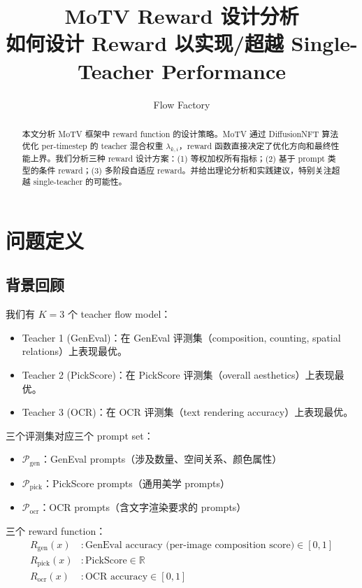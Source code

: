 \documentclass[11pt,a4paper]{article}
\title{\textbf{MoTV Reward 设计分析}\\[0.3em]
\large 如何设计 Reward 以实现/超越 Single-Teacher Performance}
\author{Flow Factory}
\date{}
\newcommand{\R}{\mathbb{R}}
\theoremstyle{definition}
\begin{document}
\maketitle

\begin{abstract}
本文分析 MoTV 框架中 reward function 的设计策略。MoTV 通过 DiffusionNFT 算法优化 per-timestep 的 teacher 混合权重 $\lambda_{k,i}$，reward 函数直接决定了优化方向和最终性能上界。我们分析三种 reward 设计方案：(1) 等权加权所有指标；(2) 基于 prompt 类型的条件 reward；(3) 多阶段自适应 reward。并给出理论分析和实践建议，特别关注超越 single-teacher 的可能性。
\end{abstract}

\tableofcontents
\newpage

\section{问题定义}

\subsection{背景回顾}

我们有 $K=3$ 个 teacher flow model：
\begin{itemize}[leftmargin=1.5em]
\item Teacher 1 (GenEval)：在 GenEval 评测集（composition, counting, spatial relations）上表现最优。
\item Teacher 2 (PickScore)：在 PickScore 评测集（overall aesthetics）上表现最优。
\item Teacher 3 (OCR)：在 OCR 评测集（text rendering accuracy）上表现最优。
\end{itemize}

三个评测集对应三个 prompt set：
\begin{itemize}[leftmargin=1.5em]
\item $\mathcal{P}_{\mathrm{gen}}$：GenEval prompts（涉及数量、空间关系、颜色属性）
\item $\mathcal{P}_{\mathrm{pick}}$：PickScore prompts（通用美学 prompts）
\item $\mathcal{P}_{\mathrm{ocr}}$：OCR prompts（含文字渲染要求的 prompts）
\end{itemize}

三个 reward function：
\begin{align}
R_{\mathrm{gen}}(x) &: \text{GenEval accuracy (per-image composition score)} \in [0, 1] \\
R_{\mathrm{pick}}(x) &: \text{PickScore} \in \R \\
R_{\mathrm{ocr}}(x) &: \text{OCR accuracy} \in [0, 1]
\end{align}
\end{document}
